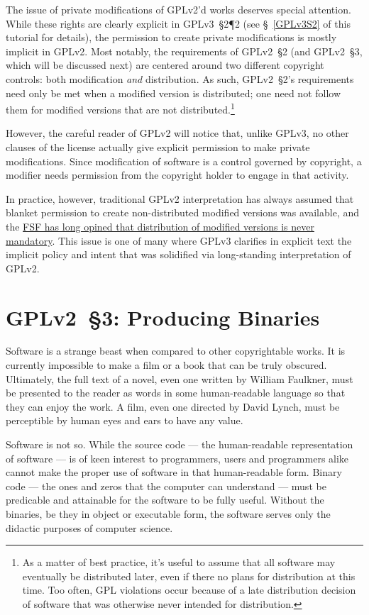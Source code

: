 The issue of private modifications of GPLv2'd works deserves special
attention.  While these rights are clearly explicit in GPLv3~\S2\P2 (see
\S~\ref{GPLv3S2} of this tutorial for details), the permission to create
private modifications is mostly implicit in GPLv2.  Most notably, the
requirements of GPLv2~\S2 (and GPLv2~\S3, which will be discussed next) are
centered around two different copyright controls: both modification
\emph{and} distribution.  As such, GPLv2~\S2's requirements need only be met
when a modified version is distributed; one need not follow them for modified
versions that are not distributed.\footnote{As a matter of best practice, it's
  useful to assume that all software may eventually be distributed later,
  even if there no plans for distribution at this time.  Too often, GPL
  violations occur because of a late distribution decision of software that
  was otherwise never intended for distribution.}

However, the careful reader of GPLv2 will notice that, unlike GPLv3, no other
clauses of the license actually give explicit permission to make private
modifications.  Since modification of software is a control governed by
copyright, a modifier needs permission from the copyright holder to engage in
that activity.

In practice, however, traditional GPLv2 interpretation has always assumed
that blanket permission to create non-distributed modified versions was
available, and the
\href{http://www.gnu.org/licenses/gpl-faq.html#GPLRequireSourcePostedPublic}{FSF
  has long opined that distribution of modified versions is never mandatory}.
This issue is one of many where GPLv3 clarifies in explicit text the implicit
policy and intent that was solidified via long-standing interpretation of
GPLv2.

\section{GPLv2~\S3: Producing Binaries}
\label{GPLv2s3}

Software is a strange beast when compared to other copyrightable works.
It is currently impossible to make a film or a book that can be truly
obscured.  Ultimately, the full text of a novel, even one written by
William Faulkner, must be presented to the reader as words in some
human-readable language so that they can enjoy the work.  A film, even one
directed by David Lynch, must be perceptible by human eyes and ears to
have any value.

Software is not so.  While the source code --- the human-readable
representation of software --- is of keen interest to programmers, users and
programmers alike cannot make the proper use of software in that
human-readable form.  Binary code --- the ones and zeros that the computer
can understand --- must be predicable and attainable for the software to
be fully useful.  Without the binaries, be they in object or executable
form, the software serves only the didactic purposes of computer science.

